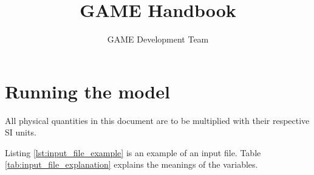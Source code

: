 \documentclass[10pt]{report}
\title{GAME Handbook}
\author{GAME Development Team}
\date{}
\begin{document}
\maketitle

\section{Running the model}
\label{sec:running_the_model}

All physical quantities in this document are to be multiplied with their respective SI units.

\label{lst:input_file_example}

Listing \ref{lst:input_file_example} is an example of an input file. Table \ref{tab:input_file_explanation} explains the meanings of the variables.
\end{document}
